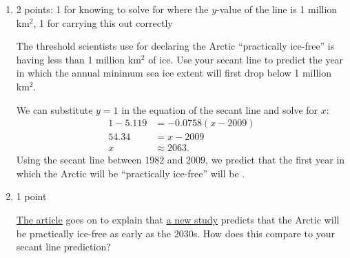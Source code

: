 \documentclass{article}
\makeatletter
\let\@href=\href
\renewcommand{\href}[2]{\@href{#1}{\ul{#2}}}
\makeatother
\begin{document}
\begin{enumerate}
\begin{enumerate}
\begin{solution}
      The average rate of change between 1982 and 2009 is
      \[\frac{5.119-7.166}{2009-1982}\approx -0.0758\text{ million km$^2$ per year}.\]

      This is the slope of the secant line, and we can use point-slope form to write the equation:
      \[\boxed{y - 5.119 = -0.0758(x-2009).}\]
    \end{solution}

  \item \label{sea-ice-when-ice-free-secant-line-prediction}

    \begin{grading}
      2 points: 1 for knowing to solve for where the $y$-value of the line is 1 million km$^2$, 1 for carrying this out correctly 
    \end{grading}

    \begin{problem}[\vfill\newpage]
      The threshold scientists use for declaring the Arctic ``practically ice-free'' is having less than 1 million km$^2$ of ice. Use your secant line to predict the year in which the annual minimum sea ice extent will first drop below 1 million km$^2$.
    \end{problem}

    \begin{solution}
      We can substitute $y=1$ in the equation of the secant line and solve for $x$:
      \begin{align*}
        1 - 5.119 &= -0.0758(x-2009) \\
        54.34 &= x-2009 \\
        x & \approx 2063.
      \end{align*}
      Using the secant line between 1982 and 2009, we predict that the first year in which the Arctic will be
      ``practically ice-free'' will be .
    \end{solution}

  \item \label{sea-ice-compare-prediction}

    \begin{grading}
      1 point  
    \end{grading}

    \begin{problem}[\stretch{0.5}]
      \href{https://www.nytimes.com/2023/06/06/climate/arctic-sea-ice-melting.html?unlocked_article_code=1.HU4.c_XS.kUPtWv2pzsvT&smid=url-share}{The article} goes on to explain that \href{https://www.nature.com/articles/s41467-023-38511-8}{a new study} predicts that the Arctic will be practically ice-free as early as the 2030s. How does this compare to your secant line prediction?
    \end{problem}


\end{enumerate}
\end{enumerate}
\end{document}
